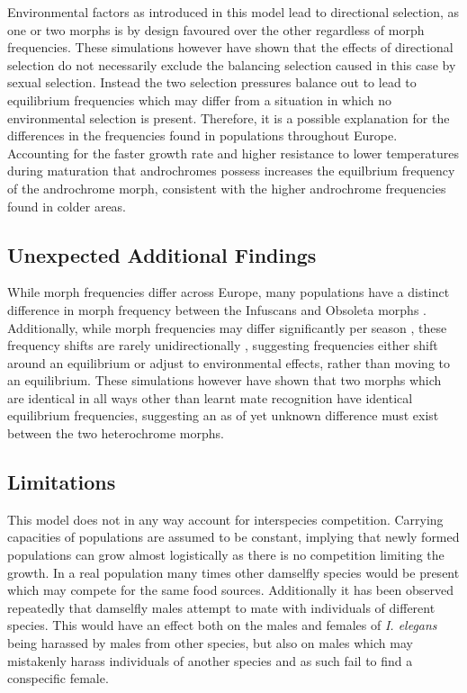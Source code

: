 \documentclass{article}
\begin{document}
Environmental factors as introduced in this model lead to directional selection, as one or two morphs is by design favoured over the other regardless of morph frequencies. These simulations however have shown that the effects of directional selection do not necessarily exclude the balancing selection caused in this case by sexual selection. Instead the two selection pressures balance out to lead to equilibrium frequencies which may differ from a situation in which no environmental selection is present. Therefore, it is a possible explanation for the differences in the frequencies found in populations throughout Europe. Accounting for the faster growth rate and higher resistance to lower temperatures during maturation that androchromes possess \cite{Svensson2019} increases the equilbrium frequency of the androchrome morph, consistent with the higher androchrome frequencies found in colder areas.

\subsection{Unexpected Additional Findings}
While morph frequencies differ across Europe, many populations have a distinct difference in morph frequency between the Infuscans and Obsoleta morphs \cite{Gosden2011}. Additionally, while morph frequencies may differ significantly per season \cite{Gosden2011, LeRouzic2015}, these frequency shifts are rarely unidirectionally \cite{Gosden2011}, suggesting frequencies either shift around an equilibrium or adjust to environmental effects, rather than moving to an equilibrium. These simulations however have shown that two morphs which are identical in all ways other than learnt mate recognition have identical equilibrium frequencies, suggesting an as of yet unknown difference must exist between the two heterochrome morphs.

\subsection{Limitations}
This model does not in any way account for interspecies competition. Carrying capacities of populations are assumed to be constant, implying that newly formed populations can grow almost logistically as there is no competition limiting the growth. In a real population many times other damselfly species would be present which may compete for the same food sources. Additionally it has been observed repeatedly that damselfly males attempt to mate with individuals of different species. This would have an effect both on the males and females of \textit{I. elegans} being harassed by males from other species, but also on males which may mistakenly harass individuals of another species and as such fail to find a conspecific female.


\printbibliography
\end{document}
